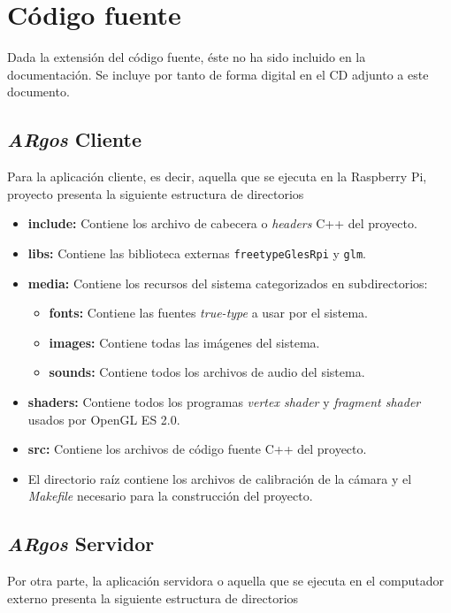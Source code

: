 \chapter{Código fuente}
\label{chap:anexo_codigo_fuente}

Dada la extensión del código fuente, éste no ha sido incluido en la documentación. Se incluye por
tanto de forma digital en el CD adjunto a este documento.

\section{\textit{ARgos} Cliente}
Para la aplicación cliente, es decir, aquella que se ejecuta en la Raspberry Pi, proyecto presenta
la siguiente estructura de directorios

\begin{itemize}
\item \textbf{include:} Contiene los archivo de cabecera o \textit{headers} C++ del proyecto.
\item \textbf{libs:} Contiene las biblioteca externas \texttt{freetypeGlesRpi} y \texttt{glm}.
\item \textbf{media:} Contiene los recursos del sistema categorizados en subdirectorios:
  \begin{itemize}
    \item \textbf{fonts:} Contiene las fuentes \textit{true-type} a usar por el sistema.
    \item \textbf{images:} Contiene todas las imágenes del sistema.
    \item \textbf{sounds:} Contiene todos los archivos de audio del sistema.
  \end{itemize}
\item \textbf{shaders:} Contiene todos los programas \textit{vertex shader} y \textit{fragment
    shader} usados por OpenGL ES 2.0.
\item \textbf{src:} Contiene los archivos de código fuente C++ del proyecto.
\item El directorio raíz contiene los archivos de calibración de la cámara y el \textit{Makefile}
  necesario para la construcción del proyecto.
\end{itemize}

\section{\textit{ARgos} Servidor}
Por otra parte, la aplicación servidora o aquella que se ejecuta en el computador externo presenta
la siguiente estructura de directorios

